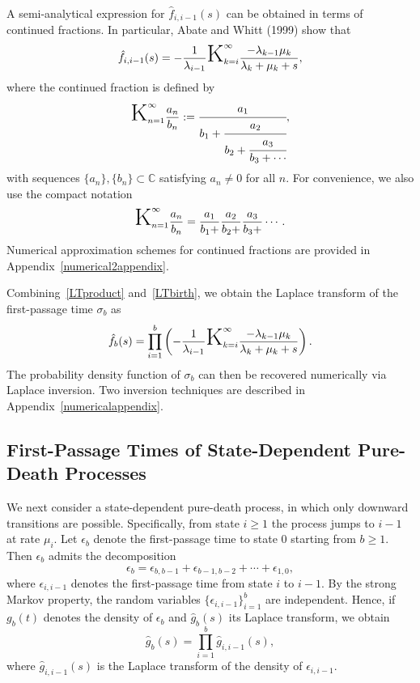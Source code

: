 \documentclass[11pt]{article}
\begin{document}
A semi-analytical expression for $\hat{f}_{i,i-1}(s)$ can be obtained in terms of continued fractions. In particular, Abate and Whitt (1999) show that
\begin{equation}\label{LTbirth}
\hat{f}_{i,i-1}(s)
=
-\frac{1}{\lambda_{i-1}}
\text{{\huge K}}_{k=i}^\infty
\frac{-\lambda_{k-1}\mu_k}{\lambda_k+\mu_k+s},
\end{equation}
where the continued fraction is defined by
\begin{equation}\label{confrac}
\text{{\huge K}}_{n=1}^\infty \frac{a_n}{b_n}
:=
\cfrac{a_1}{b_1+\cfrac{a_2}{b_2+\cfrac{a_3}{b_3+\cdots}}},
\end{equation}
with sequences $\{a_n\},\{b_n\}\subset\mathbb{C}$ satisfying $a_n\neq 0$ for all $n$. For convenience, we also use the compact notation
\[
\text{{\huge K}}_{n=1}^\infty \frac{a_n}{b_n}
=
\frac{a_1}{b_1+}\frac{a_2}{b_2+}\frac{a_3}{b_3+}\cdots.
\]
Numerical approximation schemes for continued fractions are provided in Appendix~\ref{numerical2appendix}.

Combining~\eqref{LTproduct} and~\eqref{LTbirth}, we obtain the Laplace transform of the first-passage time $\sigma_b$ as
\begin{equation}\label{laplacef_b}
\hat{f}_b(s)
=
\prod_{i=1}^b
\left(
-\frac{1}{\lambda_{i-1}}
\text{{\huge K}}_{k=i}^\infty
\frac{-\lambda_{k-1}\mu_k}{\lambda_k+\mu_k+s}
\right).
\end{equation}
The probability density function of $\sigma_b$ can then be recovered numerically via Laplace inversion. Two inversion techniques are described in Appendix~\ref{numericalappendix}.

\subsection{First-Passage Times of State-Dependent Pure-Death Processes}\label{SectionFPTDeath}

We next consider a state-dependent pure-death process, in which only downward transitions are possible. Specifically, from state $i\geq 1$ the process jumps to $i-1$ at rate $\mu_i$. Let $\epsilon_b$ denote the first-passage time to state $0$ starting from $b\geq 1$. Then $\epsilon_b$ admits the decomposition
\begin{equation}\label{fpt_sum_death}
\epsilon_b
=
\epsilon_{b,b-1}+\epsilon_{b-1,b-2}+\cdots+\epsilon_{1,0},
\end{equation}
where $\epsilon_{i,i-1}$ denotes the first-passage time from state $i$ to $i-1$. By the strong Markov property, the random variables $\{\epsilon_{i,i-1}\}_{i=1}^b$ are independent. Hence, if $g_b(t)$ denotes the density of $\epsilon_b$ and $\hat{g}_b(s)$ its Laplace transform, we obtain
\begin{equation}\label{LTproduct_death}
\hat{g}_b(s)
=
\prod_{i=1}^b \hat{g}_{i,i-1}(s),
\end{equation}
where $\hat{g}_{i,i-1}(s)$ is the Laplace transform of the density of $\epsilon_{i,i-1}$.
\end{document}
